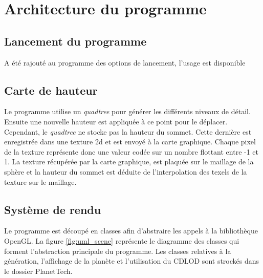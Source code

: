   	
  \chapter{Architecture du programme}
  
  \section{Lancement du programme}
  A été rajouté au programme des options de lancement, l'usage est disponible 
  
  \section{Carte de hauteur}
  
  Le programme utilise un \emph{quadtree} pour générer les différents niveaux de détail. 
  Ensuite une nouvelle hauteur est appliquée à ce point pour le déplacer. 
  Cependant, le \emph{quadtree} ne stocke pas la hauteur du sommet. Cette dernière
  est enregistrée dans une texture 2d et est envoyé à la carte graphique. 
  Chaque pixel de la texture représente donc une valeur codée sur un nombre flottant entre -1 et 1.
  La texture récupérée par la carte graphique, est plaquée sur le maillage de la sphère et la hauteur du sommet
  est déduite de l'interpolation des texels de la texture sur le maillage.
  
  
  \section{Système de rendu}
  Le programme est découpé en classes afin d'abstraire les appels à la bibliothèque OpenGL. La figure \ref{fig:uml_scene} représente le diagramme des classes qui forment l'abstraction principale du programme.
  Les classes relatives à la génération, l'affichage de la planète et l'utilisation du CDLOD sont strockés dans le dossier
  PlanetTech.
  
